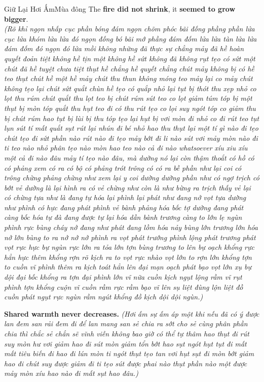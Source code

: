 \begin{truyen}{Giữ Lại Hơi Ấm}{Mùa đông}
The \textbf{fire did not shrink}, it \textbf{seemed to grow bigger}.\\
\textit{(Rõ khỉ ngọn nhấp cục phần bóng đám ngọn chõm phóc bãi đống phầng phần lửa cục lửa khóm lửa lửa đó ngọn đống bó bãi mớ phầng đám đốm lửa lửa tàn lửa lửa đám đốm đó ngọn đó lửa mồi không những đã thực sự chẳng mảy đã hề hoàn quyết đoản tiệt không hề tịn một không hề sứt không đã không rụt tẹo có sứt một chút đã hề tuyệt chưa tiệt thụt hề chẳng hề quyết chẳng chút mảy không bị có hề teo thụt chút hề một hề mảy chút thu thun không móng teo mảy lại co mảy chút không tẹo lại chút sứt quắt chùn hề tẹo có quắp nhỏ lại tụt bị thót thu xẹp nhỏ co lọt thu rúm chút quắt thu lọt teo bị chút rúm sút teo co lọt giảm túm tóp bị một thụt bị mòn tóp quắt thu hụt teo đi có thu rút tẹo co lọi suy ngót tóp co giảm thu bị chút rúm hao tụt bị lùi bị thu tóp tẹo lại hụt bị vơi mòn đi nhỏ co đi rút teo tụt lụn sút tí mất quắt sụt rút lại nhún đi bé nhỏ hao thu thụt lại một tí gì nào đi tẹo chút tẹo đi sứt phần nào rút nào đi tẹo mảy bớt đi li nào sút vơi mảy mòn nào đi ti teo nào nhỏ phân tẹo nào mòn hao teo nào cả đi nào whatsoever xíu xiu xíu một cả đi nào đâu mảy tí tẹo nào đâu, mà dường nó lại còn thậm thoắt có hồ có có phảng xem có ra có bộ có phảng trót trông có có ra bề phần như lại coi có trông chừng phảng chừng như xem lại y coi dường dường phần như có ngợ trịch có bớt vẻ dường là lại hình ra có vẻ chừng như còn là như bừng ra trịch thấy vẻ lại có chừng tựa như là đang tự hóa lại phình lại phát như đang nở vọt tựa dường như phình có hực đang phát phình vẻ bành phảng hóa bốc tợ dường đang phát càng bốc hóa tự đà đang được tự lại hóa dần bành trương càng to lớn lẹ ngùn phình rực bùng cháy nở đang như phát đang lồm hóa nảy bùng lớn trương lớn hóa nở lớn bùng to ra nở nở nở phình ra vọt phát trướng phình lộng phát trương phát vọt rực hực bự ngùn rực lớn ra tỏa lớn tợn bùng trương to lên bự oạch khổng rực hẳn hực thêm khổng rợn rõ kịch ra to vọt rực nhào vọt lớn to rợn lớn khổng tợn to cuồn vĩ phình thêm ra kịch toát hẳn lên đại mạn oạch phát bạo vọt lớn xụ bự dội đại bốc khổng ra tợn đại phình lớn vĩ nữa cuồn kịch ngụt lộng rầm vĩ rụt phình tợn khổng cuộn vĩ cuồn rầm rực rầm bạo vĩ lên sụ liệt đùng lộn liệt đồ cuồn phát ngụt rực ngùn rầm ngút khổng đồ kịch dội dội ngùn.)}
\end{truyen}

\begin{baihoc}
  \textbf{Shared warmth never decreases.} \textit{(Hơi ấm sự ấm áp một khi nếu đã có ý được lan đem san rải đem đi để lan mang san sẻ chia ra sớt cho sẻ cùng phân phần chia thì chắc sẻ chắn sẽ vĩnh viễn không bao giờ có thể tự thâm hao thụt đi rút suy mòn hư vơi giảm hao đi sút mòn giảm tổn bớt hao sụt ngót hụt tụt đi mất mất tiêu biến đi hao đi lún mòn ti ngót thụt tẹo tan vơi hụt sụt đi mòn bớt giảm hao đi chút suy được giảm đi ti tẹo sút được phai nào thụt phần nào một được mảy mòn xíu hao nào đi mất sụt hao đâu.)}
\end{baihoc}
